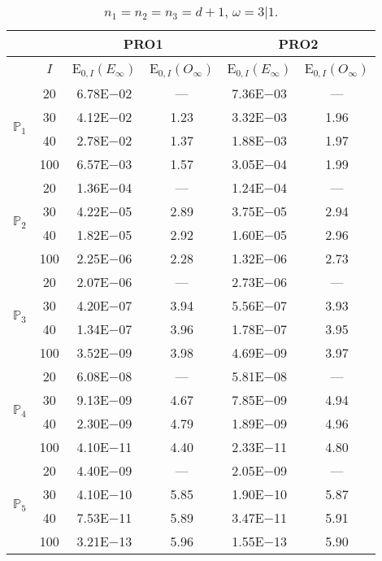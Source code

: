 \begin{table}[H]
\caption{$n_1=n_2=n_3=d+1$, $\omega=3|1$.}
\setlength{\tabcolsep}{5pt}
\centering
\begin{tabular}{@{}l c c c c c@{}}
\toprule
 &  & \multicolumn{2}{c}{PRO1} & \multicolumn{2}{c}{PRO2}\\
\midrule
 & $I$ & E$_{0,I}(E_{\infty})$ & E$_{0,I}(O_{\infty})$ & E$_{0,I}(E_{\infty})$ & E$_{0,I}(O_{\infty})$\\
\midrule
\multirow{4}{*}{$\mathbb{P}_{1}$}
 & 20 & 6.78E$-$02 & --- & 7.36E$-$03 & ---\\
 & 30 & 4.12E$-$02 & 1.23 & 3.32E$-$03 & 1.96 \\
 & 40 & 2.78E$-$02 & 1.37 & 1.88E$-$03 & 1.97 \\
 & 100 & 6.57E$-$03 & 1.57 & 3.05E$-$04 & 1.99 \\
\midrule
\multirow{4}{*}{$\mathbb{P}_{2}$}
 & 20 & 1.36E$-$04 & --- & 1.24E$-$04 & ---\\
 & 30 & 4.22E$-$05 & 2.89 & 3.75E$-$05 & 2.94 \\
 & 40 & 1.82E$-$05 & 2.92 & 1.60E$-$05 & 2.96 \\
 & 100 & 2.25E$-$06 & 2.28 & 1.32E$-$06 & 2.73 \\
\midrule
\multirow{4}{*}{$\mathbb{P}_{3}$}
 & 20 & 2.07E$-$06 & --- & 2.73E$-$06 & ---\\
 & 30 & 4.20E$-$07 & 3.94 & 5.56E$-$07 & 3.93 \\
 & 40 & 1.34E$-$07 & 3.96 & 1.78E$-$07 & 3.95 \\
 & 100 & 3.52E$-$09 & 3.98 & 4.69E$-$09 & 3.97 \\
\midrule
\multirow{4}{*}{$\mathbb{P}_{4}$}
 & 20 & 6.08E$-$08 & --- & 5.81E$-$08 & ---\\
 & 30 & 9.13E$-$09 & 4.67 & 7.85E$-$09 & 4.94 \\
 & 40 & 2.30E$-$09 & 4.79 & 1.89E$-$09 & 4.96 \\
 & 100 & 4.10E$-$11 & 4.40 & 2.33E$-$11 & 4.80 \\
\midrule
\multirow{4}{*}{$\mathbb{P}_{5}$}
 & 20 & 4.40E$-$09 & --- & 2.05E$-$09 & ---\\
 & 30 & 4.10E$-$10 & 5.85 & 1.90E$-$10 & 5.87 \\
 & 40 & 7.53E$-$11 & 5.89 & 3.47E$-$11 & 5.91 \\
 & 100 & 3.21E$-$13 & 5.96 & 1.55E$-$13 & 5.90 \\
\bottomrule
\end{tabular}
\label{Table:PRO:Rodrigo:Test2}
\end{table}
